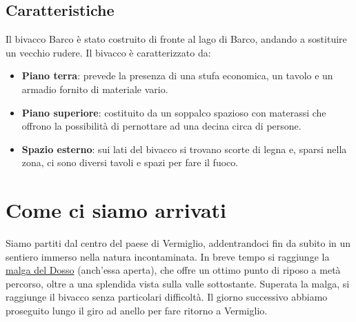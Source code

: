 \documentclass{article}
\begin{document}
\subsection{Caratteristiche}
Il bivacco Barco è stato costruito di fronte al lago di Barco, andando a sostituire un vecchio rudere.
Il bivacco è caratterizzato da:
\begin{itemize}
\item \textbf{Piano terra}: prevede la presenza di una stufa economica, un tavolo e un armadio fornito di materiale vario.
\item \textbf{Piano superiore}: costituito da un soppalco spazioso con materassi che offrono la possibilità di pernottare ad una decina circa di persone.
\item \textbf{Spazio esterno}: sui lati del bivacco si trovano scorte di legna e, sparsi nella zona, ci sono diversi tavoli e spazi per fare il fuoco.
\end{itemize}

\section{Come ci siamo arrivati}
Siamo partiti dal centro del paese di Vermiglio, addentrandoci fin da subito in un sentiero immerso nella natura incontaminata. In breve tempo si raggiunge la \href{https://maps.google.com/?q=46.290830,10.729838}{malga del Dosso} (anch'essa aperta), che offre un ottimo punto di riposo a metà percorso, oltre a una splendida vista sulla valle sottostante. Superata la malga, si raggiunge il bivacco senza particolari difficoltà.
Il giorno successivo abbiamo proseguito lungo il giro ad anello per fare ritorno a Vermiglio.
\end{document}
